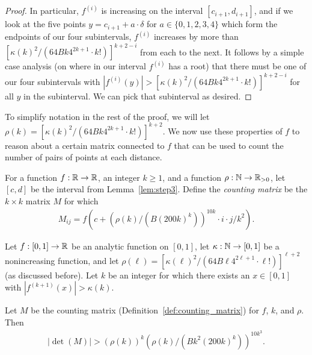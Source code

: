\begin{proof}
In particular, $f^{(i)}$ is increasing on the interval $[c_{i+1}, d_{i+1}]$, and if we look at the five points $y = c_{i+1} + a \cdot \delta$ for $a \in \{0,1,2,3,4\}$ which form the endpoints of our four subintervals, $f^{(i)}$ increases by more than $\left[ \kappa(k)^2 / (64 Bk4^{2k+1} \cdot k!) \right]^{k+2-i}$ from each to the next. It follows by a simple case analysis (on where in our interval $f^{(i)}$ has a root) that there must be one of our four subintervals with $|f^{(i)}(y)| > \left[ \kappa(k)^2 / (64 Bk4^{2k+1} \cdot k!) \right]^{k+2-i}$ for all $y$ in the subinterval. We can pick that subinterval as desired.
\end{proof}

To simplify notation in the rest of the proof, we will let $\rho(k) = \left[\kappa(k)^2/(64Bk4^{2k+1}\cdot k!)\right]^{k+2}$. We now use these properties of $f$ to reason about a certain matrix connected to $f$ that can be used to count the number of pairs of points at each distance. 

\begin{definition}\label{def:counting_matrix}
For a function $f : {\mathbb R} \rightarrow {\mathbb R}$, an integer $k \geq 1$, and a function $\rho: {\mathbb N}\rightarrow \mathbb{R}_{>0}$, let $[c,d]$ be the interval from Lemma~\ref{lem:step3}. Define the \emph{counting matrix} be the $k\times k$ matrix $M$ for which 
\begin{align*}
M_{ij} = f(c + (\rho(k)/(B(200k)^k))^{10k} \cdot i \cdot j / k^2).
\end{align*}
\end{definition}

\begin{lemma} \label{lem:step4}
Let $f : [0,1] \to {\mathbb R}$ be an analytic function on $[0,1]$, let $\kappa: {\mathbb N} \to [0,1]$ be a nonincreasing function, and let $\rho(\ell) = \left[\kappa(\ell)^2/(64B\ell4^{2\ell+1}\cdot \ell!)\right]^{\ell+2}$ (as discussed before). Let $k$ be an integer for which there exists an $x\in [0,1]$ with $|f^{(k+1)}(x)| > \kappa(k)$.

Let $M$ be the counting matrix (Definition~\ref{def:counting_matrix}) for $f$, $k$, and $\rho$. Then \begin{align*}
|\det(M)| > (\rho(k))^k(\rho(k)/(Bk^2(200k)^k))^{10k^3}.
\end{align*}
\end{lemma}

